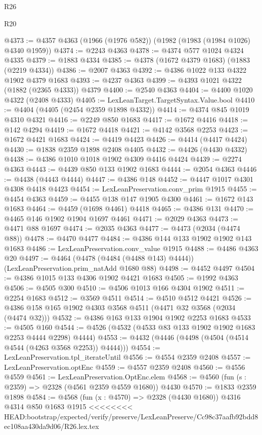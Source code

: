 \begin{lexlean}{R26}
\begin{lexlean}{R20}
\begin{coremodule}
{{{{{{{{{{{{{{{{{{{{{{{{{{{{{{{{{{{{{{{{{{{{{{{{{{{{{{{{{{{{{{{@4373 := @4357 @4363 (@1966 (@1976 @582)) (@1982 (@1983 (@1984 @1026) @4340 @1959))
@4374 := @2243 @4363
@4378 := @4374 @577 @1024 @4324 @4335
@4379 := @1883 @4334
@4385 := @4378 (@1672 @4379 @1683) (@1883 (@2219 @4334))
@4386 := @2007 @4363
@4392 := @4386 @1022 @133 @4322 @1902 @4379 @1683
@4393 := @4237 @4363
@4399 := @4393 @1021 @4322 (@1882 (@2365 @4333)) @4379
@4400 := @2540 @4363
@4404 := @4400 @1020 @4322 (@2408 @4333)
@4405 := LexLeanTarget.TargetSyntax.Value.bool
@4410 := @4404 (@4405 (@2454 @2359 @1898 @4332))
@4414 := @4374 @845 @1019 @4310 @4321
@4416 := @2249 @850 @1683
@4417 := @1672 @4416
@4418 := @142 @4294
@4419 := @1672 @4418
@4421 := @4142 @3568 @2253
@4423 := @1672 @4421 @1683
@4424 := @4419 @4423
@4426 := @4414 (@4417 @4424)
@4430 := @1838 @2359 @1898 @2408 @4405
@4432 := @4426 (@4430 @4332)
@4438 := @4386 @1010 @1018 @1902 @4309 @4416 @4424
@4439 := @2274 @4363
@4443 := @4439 @850 @133 @1902 @1683
@4444 := @2054 @4363
@4446 := @4438 (@4443 @4444)
@4447 := @4386 @148
@4452 := @4447 @1017 @4301 @4308 @4418 @4423
@4454 := LexLeanPreservation.conv_prim @1915
@4455 := @4454 @4363
@4459 := @4455 @138 @147 @1905 @4300
@4461 := @1672 @143 @1683
@4464 := @4459 (@1698 @4461) @4418
@4465 := @4386 @131
@4470 := @4465 @146 @1902 @1904 @1697 @4461
@4471 := @2029 @4363
@4473 := @4471 @88 @1697
@4474 := @2035 @4363
@4477 := @4473 (@2034 (@4474 @88))
@4478 := @4470 @4477
@4484 := @4386 @144 @133 @1902 @1902 @143 @1683
@4486 := LexLeanPreservation.conv_value @1915
@4488 := @4486 @4363 @20
@4497 := @4464 (@4478 (@4484 (@4488 @143) @4444)) (LexLeanPreservation.prim_natAdd @1680 @88)
@4498 := @4452 @4497
@4504 := @4386 @1015 @133 @4306 @1902 @4421 @1683
@4505 := @1992 @4363
@4506 := @4505 @300
@4510 := @4506 @1013 @166 @4304 @1902
@4511 := @2254 @1683
@4512 := @3569 @4511
@4514 := @4510 @4512 @4421
@4526 := @4386 @158 @165 @1902 @4303 @3568 @4511 (@4471 @32 @3568 (@2034 (@4474 @32)))
@4532 := @4386 @163 @133 @1904 @1902 @2253 @1683
@4533 := @4505 @160
@4544 := @4526 (@4532 (@4533 @83 @133 @1902 @1902 @1683 @2253 @4444 @2298) @4444)
@4553 := @4432 (@4446 (@4498 (@4504 (@4514 @4544 (@4263 @3568 @2253)) @4444)))
@4554 := LexLeanPreservation.tpl_iterateUntil
@4556 := @4554 @2359 @2408
@4557 := LexLeanPreservation.optEnc
@4559 := @4557 @2359 @2408
@4560 := @4556 @4559
@4561 := LexLeanPreservation.OptEnc.elem
@4568 := @4560 (fun (s : @2359) => @2328 (@4561 @2359 @4559 @1680)) @4430
@4570 := @1833 @2359 @1898
@4584 := @4568
    (fun (x : @4570) => @2328 (@4430 @1680))
    @4316
    @4314
    @850
    @1683
    @1915
<<<<<<<< HEAD:bootstrap/expected/verify/preserve/LexLeanPreserve/Cc98c37aafb92bdd8ec108aa430da9d06/R26.lex.tex
}}}}}}}}}}}}}}}}}}}}}}}}}}}}}}}}}}}}}}}}}}}}}}}}}}}}}}}}}}}}}}}
\end{coremodule}
\end{lexlean}
\end{lexlean}
